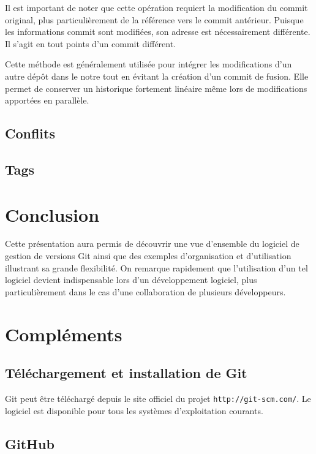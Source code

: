 \documentclass[11pt,a4paper]{article}
\begin{document}
Il est important de noter que cette opération requiert la modification du commit original, plus particulièrement de la référence vers le commit antérieur.
Puisque les informations commit sont modifiées, son adresse est nécessairement différente. Il s'agit en tout points d'un commit différent.

Cette méthode est généralement utilisée pour intégrer les modifications d'un autre dépôt dans le notre tout en évitant la création d'un commit de fusion.
Elle permet de conserver un historique fortement linéaire même lors de modifications apportées en parallèle.

\subsection{Conflits}

\subsection{Tags}

\section{Conclusion}

Cette présentation aura permis de découvrir une vue d'ensemble du logiciel de gestion de versions Git ainsi que des exemples d'organisation et d'utilisation illustrant sa grande flexibilité. On remarque rapidement que l'utilisation d'un tel logiciel devient indispensable lors d'un développement logiciel, plus particulièrement dans le cas d'une collaboration de plusieurs développeurs.

\pagebreak
{}
\section{Compléments}

\subsection{Téléchargement et installation de Git}

Git peut être téléchargé depuis le site officiel du projet {\tt http://git-scm.com/}.
Le logiciel est disponible pour tous les systèmes d'exploitation courants.

\subsection{GitHub}
\end{document}

